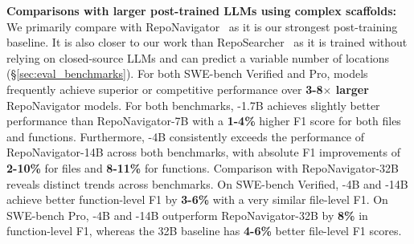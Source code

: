\textbf{Comparisons with larger post-trained LLMs using complex scaffolds:} We primarily compare \methodname with RepoNavigator~\citep{zhang2025one} as it is our strongest post-training baseline. It is also closer to our work than  RepoSearcher~\citep{ma2025toolintegratedreinforcementlearningrepo} as it is trained without relying on closed-source LLMs and can predict a variable number of locations (\S\ref{sec:eval_benchmarks}). For both SWE-bench Verified and Pro, \methodname models frequently achieve superior or competitive performance over \textbf{3-8$\times$ larger} RepoNavigator models. For both benchmarks, \methodname-1.7B achieves slightly better performance than RepoNavigator-7B  with a \textbf{1-4\%} higher F1 score for both files and functions. Furthermore, \methodname-4B consistently exceeds the performance of RepoNavigator-14B across both benchmarks, with absolute F1 improvements of \textbf{2-10\%} for files and \textbf{8-11\%} for functions. Comparison with RepoNavigator-32B reveals distinct trends across benchmarks. On SWE-bench Verified, \methodname-4B and \methodname-14B achieve better function-level F1 by \textbf{3-6\%} with a very similar file-level F1. On SWE-bench Pro, \methodname-4B and \methodname-14B outperform RepoNavigator-32B by \textbf{8\%} in function-level F1, whereas the 32B baseline has \textbf{4-6\%} better file-level F1 scores.

